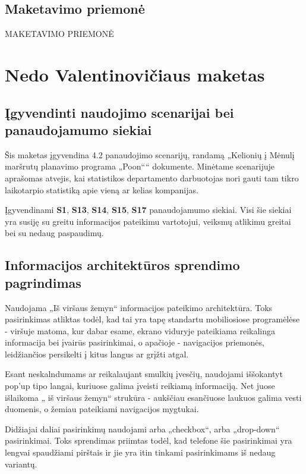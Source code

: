 \documentclass{VUMIFPSkursinis}
\begin{document}
\subsection{Maketavimo priemonė}
MAKETAVIMO PRIEMONĖ

\section{Nedo Valentinovičiaus maketas}
\subsection{Įgyvendinti naudojimo scenarijai bei panaudojamumo siekiai}
Šis maketas įgyvendina 4.2 panaudojimo scenarijų, randamą „Kelionių į Mėnulį maršrutų planavimo programa „Poon““ dokumente. Minėtame scenarijuje aprašomas atvejis, kai statistikos departamento darbuotojas nori gauti tam tikro laikotarpio statistiką apie vieną ar kelias kompanijas. 

Įgyvendinami \textbf{S1}, \textbf{S13}, \textbf{S14}, \textbf{S15}, \textbf{S17} panaudojamumo siekiai. Visi šie siekiai yra susiję su greitu informacijos pateikimu vartotojui, veiksmų atlikimu greitai bei su nedaug paspaudimų.

\subsection{Informacijos architektūros sprendimo pagrindimas}
Naudojama „Iš viršaus žemyn“ informacijos pateikimo architektūra. Toks pasirinkimas atliktas todėl, kad tai yra tapę standartu mobiliosiose programėlėse - viršuje matoma, kur dabar esame, ekrano viduryje pateikiama reikalinga informacija bei įvairūs pasirinkimai, o apačioje - navigacijos priemonės, leidžiančios persikelti į kitus langus ar grįžti atgal. 

Esant neskalndumams ar reikalaujant smulkių įvesčių, naudojami iššokantyt pop'up tipo langai, kuriuose galima įveisti reikiamą informaciją. Net juose išlaikoma „ iš viršaus žemyn“ strukūra - aukščiau esančiuose laukuos galima vesti duomenis, o žemiau pateikiami navigacijos mygtukai.

Didžiajai daliai pasirinkimų naudojami arba „checkbox“, arba „drop-down“ pasirinkimai. Toks sprendimas priimtas todėl, kad telefone šie pasirinkimai yra lengvai spaudžiami pirštais ir jie yra itin tinkami pasirinkimams iš nedaug variantų. 
\end{document}
